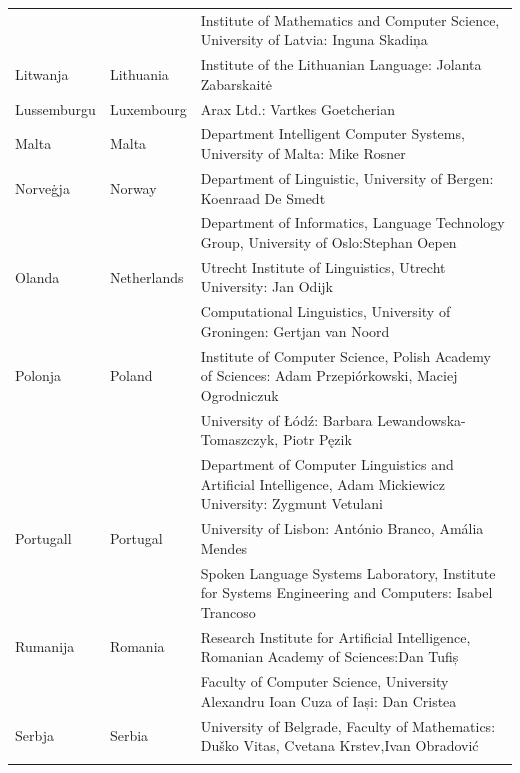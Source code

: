 \documentclass[]{../../metanetpaper}
\begin{document}
\begin{longtable}{@{}llp{113mm}@{}}
  & & Institute of Mathematics and Computer Science, University of Latvia: Inguna Skadiņa\\ \addlinespace
  Litwanja & \textcolor{grey1}{Lithuania} & Institute of the Lithuanian Language: Jolanta Zabarskaitė\\ \addlinespace
  Lussemburgu & \textcolor{grey1}{Luxembourg} & Arax Ltd.: Vartkes Goetcherian\\ \addlinespace
  Malta & \textcolor{grey1}{Malta} & Department Intelligent Computer Systems, University of Malta: Mike Rosner\\ \addlinespace
  Norveġja & \textcolor{grey1}{Norway} & Department of Linguistic, University of Bergen: Koenraad De Smedt\\ \addlinespace 
  & & Department of Informatics, Language Technology Group, University of Oslo:\newline Stephan Oepen \\ \addlinespace
  Olanda & \textcolor{grey1}{Netherlands} & Utrecht Institute of Linguistics, Utrecht University: Jan Odijk\\ \addlinespace 
  & & Computational Linguistics, University of Groningen: Gertjan van Noord\\ \addlinespace
  Polonja & \textcolor{grey1}{Poland} & Institute of Computer Science, Polish Academy of Sciences: Adam Przepiórkowski, Maciej Ogrodniczuk \\ \addlinespace
  & & University of Łódź: Barbara Lewandowska-Tomaszczyk, Piotr Pęzik\\ \addlinespace
  & & Department of Computer Linguistics and Artificial Intelligence, Adam Mickiewicz University: Zygmunt Vetulani \\ \addlinespace
  Portugall & \textcolor{grey1}{Portugal} & University of Lisbon: António Branco, Amália Mendes \\ \addlinespace
  & & Spoken Language Systems Laboratory, Institute for Systems Engineering and Computers: Isabel Trancoso \\ \addlinespace
  Rumanija & \textcolor{grey1}{Romania} & Research Institute for Artificial Intelligence, Romanian Academy of Sciences:\newline Dan Tufiș \\ \addlinespace
  & & Faculty of Computer Science, University Alexandru Ioan Cuza of Iași: Dan Cristea \\ \addlinespace
  Serbja & \textcolor{grey1}{Serbia} & University of Belgrade, Faculty of Mathematics: Duško Vitas, Cvetana Krstev,\newline Ivan Obradović \\ \addlinespace

\end{longtable}
\end{document}
